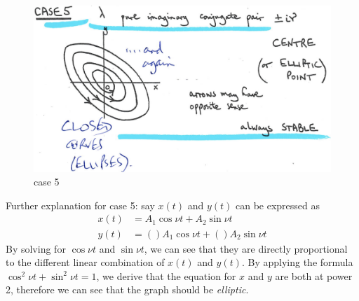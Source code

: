 \documentclass[12pt]{report}
\theoremstyle{definition}
\begin{document}
\begin{figure}
  	\includegraphics[scale=0.15]{PP5.jpeg}
  	\centering
  	\caption{case 5}\label{PP5}
\end{figure}

Further explanation for case 5: say $x(t)$ and $y(t)$ can be expressed as\[
    \begin{align*}
        x(t) & = A_1 \cos{\nu t} + A_2 \sin{\nu t} \\
        y(t) & = ()A_1 \cos{\nu t} + ()A_2 \sin{\nu t}
    \end{align*}
\]
By solving for $\cos{\nu t}$ and $\sin{\nu t}$, we can see that they are directly proportional to
the different linear combination of $x(t)$ and $y(t)$. By applying the formula
$\cos^{2}{\nu t} + \sin^{2}{\nu t} = 1$,
we derive that the equation for $x$ and $y$ are both at power 2, therefore
we can see that the graph should be \emph{elliptic}.
\end{document}
